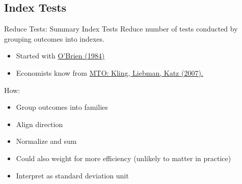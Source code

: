 \documentclass{beamer}
\begin{document}
{ %
    \begin{frame}[plain]
     \end{frame}
}
\subsection{Index Tests}
\begin{frame}{Reduce Tests: Summary Index Tests}
Reduce number of tests conducted by grouping outcomes into indexes.
\begin{itemize}
\item Started with \href{http://www.jstor.org/stable/2531158}{O'Brien (1984)}
\item Economists know from \href{https://scholar.harvard.edu/lkatz/publications/experimental-analysis-neighborhood-effects}{MTO: Kling, Liebman, Katz (2007).}
\end{itemize}
How:
\begin{itemize}
\item Group outcomes into families
\item Align direction
\item Normalize and sum
\item Could also weight for more efficiency (unlikely to matter in practice)
\item Interpret as standard deviation unit
\end{itemize}
\end{frame}
\end{document}
